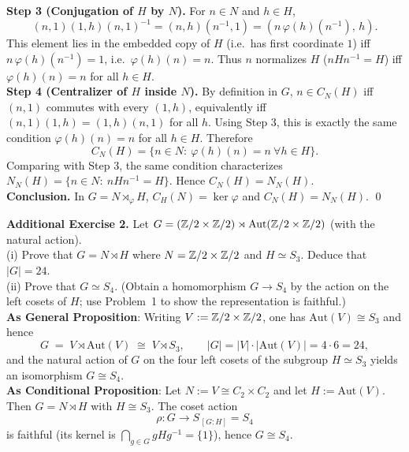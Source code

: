 \documentclass[12pt]{article}
\theoremstyle{definition}
\newcommand{\Aut}{\mathrm{Aut}}
\begin{document}
\textbf{Step 3 (Conjugation of $H$ by $N$).} For $n\in N$ and $h\in H$,
\[
(n,1)(1,h)(n,1)^{-1}
=(n,h)(n^{-1},1)
=(n\,\varphi(h)(n^{-1}),\,h).
\]
This element lies in the embedded copy of $H$ (i.e.\ has first coordinate $1$) iff $n\,\varphi(h)(n^{-1})=1$, i.e.\ $\varphi(h)(n)=n$. Thus $n$ normalizes $H$ ($nHn^{-1}=H$) iff $\varphi(h)(n)=n$ for all $h\in H$.\\

\textbf{Step 4 (Centralizer of $H$ inside $N$).} By definition in $G$, $n\in C_N(H)$ iff $(n,1)$ commutes with every $(1,h)$, equivalently iff $(n,1)(1,h)=(1,h)(n,1)$ for all $h$. Using Step 3, this is exactly the same condition $\varphi(h)(n)=n$ for all $h\in H$. Therefore
\[
C_N(H)=\{n\in N:\ \varphi(h)(n)=n\ \forall h\in H\}.
\]
Comparing with Step 3, the same condition characterizes $N_N(H)=\{n\in N:\ nHn^{-1}=H\}$. Hence $C_N(H)=N_N(H)$.\\

\medskip
\textbf{Conclusion.} In $G=N\rtimes_{\varphi}H$, $C_H(N)=\ker\varphi$ and $C_N(H)=N_N(H)$. \qed\\

\newpage

\noindent \textbf{Additional Exercise 2.} Let $G=(\Bbb Z/2\times \Bbb Z/2)\rtimes \Aut(\Bbb Z/2\times \Bbb Z/2)$ (with the natural action).\\
(i) Prove that $G=N\rtimes H$ where $N=\Bbb Z/2\times \Bbb Z/2$ and $H\simeq S_3$. Deduce that $|G|=24$.\\
(ii) Prove that $G\simeq S_4$. (Obtain a homomorphism $G\to S_4$ by the action on the left cosets of $H$; use Problem~1 to show the representation is faithful.)\\ %

\noindent\textbf{As General Proposition}: Writing $V:=\Bbb Z/2\times \Bbb Z/2$, one has $\Aut(V)\cong S_3$ and hence
\[
G\;=\;V\rtimes \Aut(V)\;\cong\; V\rtimes S_3,\qquad |G|=|V|\cdot|\Aut(V)|=4\cdot6=24,
\]
and the natural action of $G$ on the four left cosets of the subgroup $H\simeq S_3$ yields an isomorphism $G\!\cong S_4$.\\

\noindent\textbf{As Conditional Proposition}: Let $N:=V\cong C_2\times C_2$ and let $H:=\Aut(V)$. Then $G=N\rtimes H$ with $H\cong S_3$. The coset action
\[
\rho:G\longrightarrow S_{\,[G\!:\!H]}=S_4
\]
is faithful (its kernel is $\bigcap_{g\in G} gHg^{-1}=\{1\}$), hence $G\cong S_4$.\\

\newpage
\end{document}
